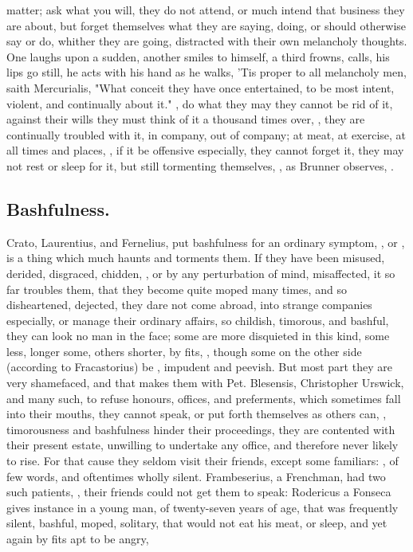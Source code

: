 {matter; ask what you will, they do not attend, or much intend that business
they are about, but forget themselves what they are saying, doing, or should
otherwise say or do, whither they are going, distracted with their own
melancholy thoughts. One laughs upon a sudden, another smiles to himself, a
third frowns, calls, his lips go still, he acts with his hand as he walks,
\etc{} 'Tis proper to all melancholy men, saith
Mercurialis,  "What conceit
they have once entertained, to be most intent, violent, and continually about
it." , do what they may they cannot be rid of it, against
their wills they must think of it a thousand times over, , they are continually troubled with it, in
company, out of company; at meat, at exercise, at all times and places,
, if it
be offensive especially, they cannot forget it, they may not rest or sleep for
it, but still tormenting themselves, , as
Brunner observes, .

\subsection{Bashfulness.}

Crato, Laurentius, and Fernelius, put
bashfulness for an ordinary symptom, , or , is a thing which much haunts and torments them. If they have been
misused, derided, disgraced, chidden, \etc{}, or by any perturbation of mind,
misaffected, it so far troubles them, that they become quite moped many times,
and so disheartened, dejected, they dare not come abroad, into strange
companies especially, or manage their ordinary affairs, so childish, timorous,
and bashful, they can look no man in the face; some are more disquieted in this
kind, some less, longer some, others shorter, by fits, \etc{}, though some on
the other side (according to Fracastorius) be
, impudent and peevish. But most part they are
very shamefaced, and that makes them with Pet. Blesensis, Christopher Urswick,
and many such, to refuse honours, offices, and preferments, which sometimes
fall into their mouths, they cannot speak, or put forth themselves as others
can, , timorousness and bashfulness hinder
their proceedings, they are contented with their present estate, unwilling to
undertake any office, and therefore never likely to rise. For that cause they
seldom visit their friends, except some familiars: , of few
words, and oftentimes wholly silent. Frambeserius, a
Frenchman, had two such patients, , their friends could
not get them to speak: Rodericus a Fonseca  gives instance in a young man, of twenty-seven years of age,
that was frequently silent, bashful, moped, solitary, that would not eat his
meat, or sleep, and yet again by fits apt to be angry, \etc{}

}
